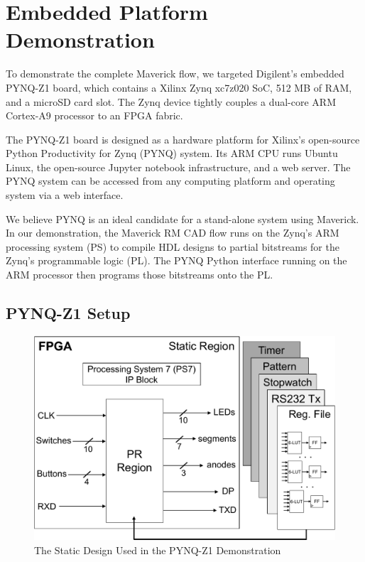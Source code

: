 \section{Embedded Platform Demonstration}
\label{sec:experiment}

To demonstrate the complete Maverick flow, we targeted Digilent's embedded PYNQ-Z1 board, which contains a Xilinx Zynq xc7z020 SoC, 512 MB of RAM, and a microSD card slot. 
The Zynq device tightly couples a dual-core ARM Cortex-A9 processor to an FPGA fabric.

The PYNQ-Z1 board is designed as a hardware platform for Xilinx's open-source Python Productivity for Zynq (PYNQ) system.
Its ARM CPU runs Ubuntu Linux, the open-source Jupyter notebook infrastructure, and a web server.
The PYNQ system can be accessed from any computing platform and operating system via a web interface.

We believe PYNQ is an ideal candidate for a stand-alone system using Maverick.
In our demonstration, the Maverick RM CAD flow runs on the Zynq's ARM processing system (PS) to compile HDL designs to partial bitstreams for the Zynq's programmable logic (PL). 
The PYNQ Python interface running on the ARM processor then programs those bitstreams onto the PL.

\subsection{PYNQ-Z1 Setup}
\label{sec:pynqSetup}

\begin{figure}
	\centering
	\includegraphics[width=.82\columnwidth,keepaspectratio]{figures/pynq_rp}
	\caption{The Static Design Used in the PYNQ-Z1 Demonstration}
	\label{fig:pynq_rp}
\end{figure}

